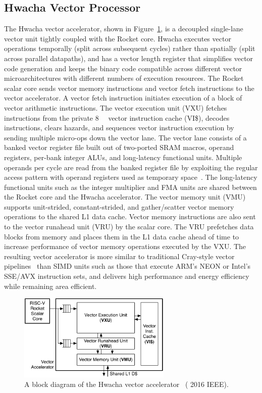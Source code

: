 \documentclass[graybox]{svmult}
\begin{document}
\subsection{Hwacha Vector Processor}

The Hwacha vector accelerator, shown in Figure~\ref{fig:6-raven3-hwacha}, is a decoupled single-lane vector unit tightly coupled with the Rocket core.
Hwacha executes vector operations temporally (split across subsequent cycles) rather than spatially (split across parallel datapaths), and has a vector length register that simplifies vector code generation and keeps the binary code compatible across different vector microarchitectures with different numbers of execution resources.
The Rocket scalar core sends vector memory instructions and vector fetch instructions to the vector accelerator.
A vector fetch instruction initiates execution of a block of vector arithmetic instructions.
The vector execution unit (VXU) fetches instructions from the private \SI{8}{\kibi\byte} vector instruction cache (VI\$), decodes instructions, clears hazards, and sequences vector instruction execution by sending multiple micro-ops down the vector lane.
The vector lane consists of a banked vector register file built out of two-ported SRAM macros, operand registers, per-bank integer ALUs, and long-latency functional units.
Multiple operands per cycle are read from the banked register file by exploiting the regular access pattern with operand registers used as temporary space~\cite{Lee2014}.
The long-latency functional units such as the integer multiplier and FMA units are shared between the Rocket core and the Hwacha accelerator.
The vector memory unit (VMU) supports unit-strided, constant-strided, and gather/scatter vector memory operations to the shared L1 data cache.
Vector memory instructions are also sent to the vector runahead unit (VRU) by the scalar core.
The VRU prefetches data blocks from memory and places them in the L1 data cache ahead of time to increase performance of vector memory operations executed by the VXU.
The resulting vector accelerator is more similar to traditional Cray-style vector pipelines~\cite{Russel1978} than SIMD units such as those that execute ARM's NEON or Intel's SSE/AVX instruction sets, and delivers high performance and energy efficiency while remaining area efficient.

\begin{figure}
  \centering
  \includegraphics[width=0.65\textwidth]{6-raven3-hwacha}
  \caption{A block diagram of the Hwacha vector accelerator~\cite{Zimmer2016} ({\textcopyright} 2016 IEEE).}
  \label{fig:6-raven3-hwacha}
\end{figure}
\end{document}
